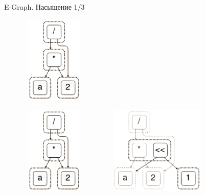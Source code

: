 \documentclass[aspectratio=169
  , xcolor={svgnames}
  , russian  %
  ]{beamer}
\begin{document}
\begin{frame}{E-Graph. Насыщение 1/3}
    {
        \begin{center}
            \includegraphics[width=5.2cm, height=4.2cm]{misc/egraphs_images/egraph_1.png} 
        \end{center}
    }
    {
        \begin{center}
            \includegraphics[width=5.2cm, height=4.2cm]{misc/egraphs_images/egraph_1.png} 
            \hspace{0.5cm} 
            \hspace{0.5cm}  
            \includegraphics[width=5.2cm, height=4.2cm]{misc/egraphs_images/egraph_2.jpg} 
        \end{center}
    }
\end{frame}
\end{document}
